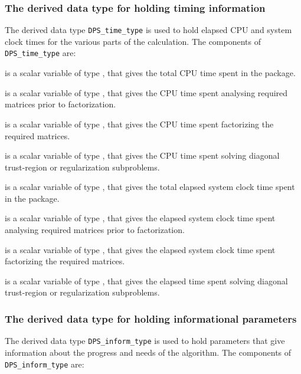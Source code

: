\documentclass{galahad}
\newcommand{\packagename}{DPS}
\begin{document}
\subsubsection{The derived data type for holding timing
 information}\label{typetime}
The derived data type
{\tt \packagename\_time\_type}
is used to hold elapsed CPU and system clock times for the various parts of
the calculation. The components of
{\tt \packagename\_time\_type}
are:
\begin{description}
 is a scalar variable of type \realdp, that gives
 the total CPU time spent in the package.

 is a scalar variable of type \realdp, that gives
 the CPU time spent analysing required matrices prior to factorization.

 is a scalar variable of type \realdp, that gives
 the CPU time spent factorizing the required matrices.

 is a scalar variable of type \realdp, that gives
 the CPU time spent solving diagonal trust-region or regularization subproblems.

 is a scalar variable of type \realdp, that gives
 the total elapsed system clock time spent in the package.

 is a scalar variable of type \realdp, that gives
 the elapsed system clock time spent analysing required matrices prior to
factorization.

 is a scalar variable of type \realdp, that gives
 the elapsed system clock time spent factorizing the required matrices.

 is a scalar variable of type \realdp,
 that gives the elapsed time spent solving diagonal trust-region or
 regularization subproblems.

\end{description}


\subsubsection{The derived data type for holding informational
 parameters}\label{typeinform}
The derived data type
{\tt \packagename\_inform\_type}
is used to hold parameters that give information about the progress and needs
of the algorithm. The components of
{\tt \packagename\_inform\_type}
are:
\end{document}
